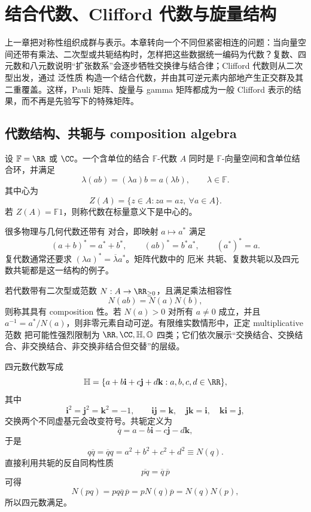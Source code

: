 \chapter{结合代数、Clifford 代数与旋量结构}
\label{chap:algebra-number-systems}

上一章把对称性组织成群与表示。本章转向一个不同但紧密相连的问题：当向量空间还带有乘法、二次型或共轭结构时，怎样把这些数据统一编码为代数？复数、四元数和八元数说明“扩张数系”会逐步牺牲交换律与结合律；Clifford 代数则从二次型出发，通过 泛性质 构造一个结合代数，并由其可逆元素内部地产生正交群及其二重覆盖。这样，Pauli 矩阵、旋量与 gamma 矩阵都成为一般 Clifford 表示的结果，而不再是先验写下的特殊矩阵。

\section{代数结构、共轭与 composition algebra}
\label{sec:algebra-composition}
设 $\mathbb F=\RR$ 或 $\CC$。一个含单位的结合 $\mathbb F$-代数 $A$ 同时是 $\mathbb F$-向量空间和含单位结合环，并满足
\[
\lambda(ab)=(\lambda a)b=a(\lambda b),
\qquad
\lambda\in\mathbb F.
\]
其中心为
\[
Z(A)=\{z\in A:za=az,\ \forall a\in A\}.
\]
若 $Z(A)=\mathbb F1$，则称代数在标量意义下是中心的。

很多物理与几何代数还带有 对合，即映射 $a\mapsto a^*$ 满足
\[
(a+b)^*=a^*+b^*,
\qquad
(ab)^*=b^*a^*,
\qquad
(a^*)^*=a.
\]
复代数通常还要求 $(\lambda a)^*=\overline\lambda a^*$。矩阵代数中的 厄米 共轭、复数共轭以及四元数共轭都是这一结构的例子。

若代数带有二次型或范数 $N:A\to\RR_{\ge0}$，且满足乘法相容性
\begin{equation}
N(ab)=N(a)N(b),
\label{eq:composition-norm}
\end{equation}
则称其具有 composition 性。若 $N(a)>0$ 对所有 $a\neq0$ 成立，并且 $a^{-1}=a^*/N(a)$，则非零元素自动可逆。有限维实数情形中，正定 multiplicative 范数 把可能性强烈限制为 $\RR,\CC,\mathbb H,\mathbb O$ 四类；它们依次展示“交换结合、交换结合、非交换结合、非交换非结合但交替”的层级。
\label{sec:quaternions}

四元数代数写成
\[
\mathbb H
=\{a+b\mathbf i+c\mathbf j+d\mathbf k:
a,b,c,d\in\RR\},
\]
其中
\[
\mathbf i^2=\mathbf j^2=\mathbf k^2=-1,
\qquad
\mathbf i\mathbf j=\mathbf k,
\quad
\mathbf j\mathbf k=\mathbf i,
\quad
\mathbf k\mathbf i=\mathbf j,
\]
交换两个不同虚基元会改变符号。共轭定义为
\[
\overline q=a-b\mathbf i-c\mathbf j-d\mathbf k,
\]
于是
\[
q\overline q=\overline q q
=a^2+b^2+c^2+d^2
\equiv N(q).
\]
直接利用共轭的反自同构性质
\[
\overline{pq}=\overline q\,\overline p
\]
可得
\[
N(pq)
=pq\overline q\,\overline p
=pN(q)\overline p
=N(q)N(p),
\]
所以四元数满足。


